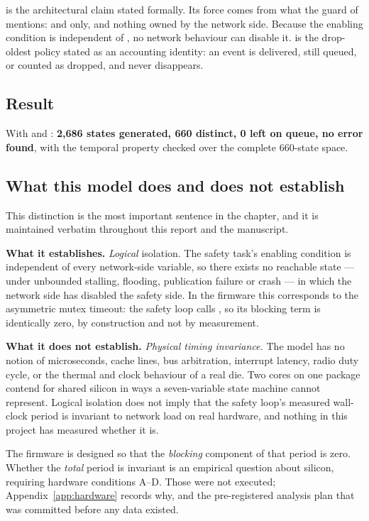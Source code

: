  is the architectural claim stated formally. Its force comes from what
the guard of  mentions:  and  only, and nothing
owned by the network side. Because the enabling condition is independent of , no
network behaviour can disable it.  is the drop-oldest policy stated as an
accounting identity: an event is delivered, still queued, or counted as dropped, and never
disappears.

\subsection{Result}

With  and : \textbf{2,686 states generated, 660 distinct, 0
left on queue, no error found}, with the temporal property checked over the complete 660-state
space.

\subsection{What this model does and does not establish}

This distinction is the most important sentence in the chapter, and it is maintained verbatim
throughout this report and the manuscript.

\textbf{What it establishes.} \emph{Logical} isolation. The safety task's enabling condition is
independent of every network-side variable, so there exists no reachable state --- under
unbounded stalling, flooding, publication failure or crash --- in which the network side has
disabled the safety side. In the firmware this corresponds to the asymmetric mutex timeout: the
safety loop calls , so its blocking term is identically
zero, by construction and not by measurement.

\textbf{What it does not establish.} \emph{Physical timing invariance.} The model has no notion
of microseconds, cache lines, bus arbitration, interrupt latency, radio duty cycle, or the
thermal and clock behaviour of a real die. Two cores on one package contend for shared silicon
in ways a seven-variable state machine cannot represent. Logical isolation does not imply that
the safety loop's measured wall-clock period is invariant to network load on real hardware, and
nothing in this project has measured whether it is.

The firmware is designed so that the \emph{blocking} component of that period is zero. Whether
the \emph{total} period is invariant is an empirical question about silicon, requiring hardware
conditions A--D. Those were not executed; Appendix~\ref{app:hardware} records why, and the
pre-registered analysis plan that was committed before any data existed.

